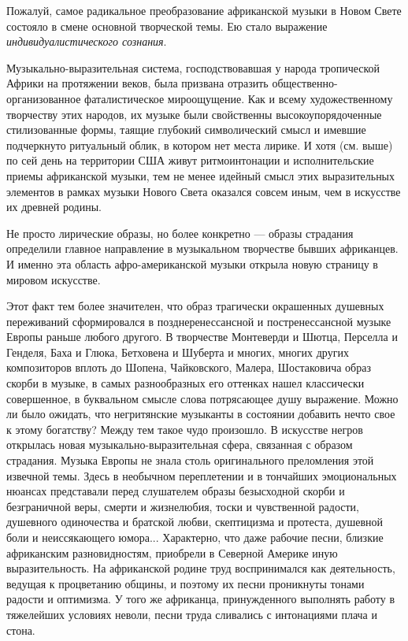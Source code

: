 Пожалуй, самое  радикальное преобразование африканской музыки  в Новом
Свете состояло  в смене основной  творческой темы. Ею  стало выражение
\emph{индивидуалистического сознания}.

Музыкально-выразительная    система,    господствовавшая   у    народа
тропической  Африки  на  протяжении   веков,  была  призвана  отразить
общественно-организованное фаталистическое  мироощущение. Как  и всему
художественному творчеству  этих народов,  их музыке  были свойственны
высокоупорядоченные стилизованные формы, таящие глубокий символический
смысл  и имевшие  подчеркнуто ритуальный  облик, в  котором нет  места
лирике.  И  хотя (см.  выше)  по  сей  день  на территории  США  живут
ритмоинтонации  и исполнительские  приемы африканской  музыки, тем  не
менее  идейный  смысл этих  выразительных  элементов  в рамках  музыки
Нового Света оказался совсем иным, чем в искусстве их древней родины.

Не просто  лирические образы,  но более  конкретно —  образы страдания
определили  главное   направление  в  музыкальном   творчестве  бывших
африканцев.  И именно  эта  область  афро-американской музыки  открыла
новую страницу в мировом искусстве.

Этот  факт  тем  более  значителен, что  образ  трагически  окрашенных
душевных    переживаний   сформировался    в   позднеренессансной    и
постренессансной  музыке Европы  раньше любого  другого. В  творчестве
Монтеверди  и Шютца,  Перселла и  Генделя, Баха  и Глюка,  Бетховена и
Шуберта  и  многих,  многих  других  композиторов  вплоть  до  Шопена,
Чайковского,  Малера,  Шостаковича  образ  скорби в  музыке,  в  самых
разнообразных его оттенках нашел классически совершенное, в буквальном
смысле слова  потрясающее душу выражение.  Можно ли было  ожидать, что
негритянские  музыканты  в  состоянии  добавить  нечто  свое  к  этому
богатству?  Между  тем  такое   чудо  произошло.  В  искусстве  негров
открылась  новая музыкально-выразительная  сфера, связанная  с образом
страдания.  Музыка Европы  не  знала  столь оригинального  преломления
этой  извечной темы.  Здесь  в необычном  переплетении  и в  тончайших
эмоциональных нюансах представали  перед слушателем образы безысходной
скорби и безграничной  веры, смерти и жизнелюбия,  тоски и чувственной
радости,  душевного  одиночества  и   братской  любви,  скептицизма  и
протеста,  душевной  боли  и неиссякающего  юмора...  Характерно,  что
даже рабочие  песни, близкие  африканским разновидностям,  приобрели в
Северной  Америке иную  выразительность.  На  африканской родине  труд
воспринимался  как  деятельность,  ведущая  к  процветанию  общины,  и
поэтому  их  песни  проникнуты  тонами радости  и  оптимизма.  У  того
же  африканца, принужденного  выполнять работу  в тяжелейших  условиях
неволи, песни труда сливались с интонациями плача и стона.

